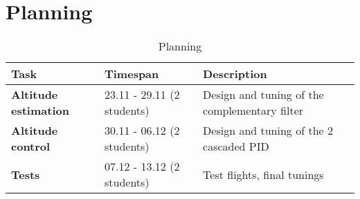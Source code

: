 \documentclass{repMobRob}
\begin{document}
\section{Planning}
\begin{table}[H]
	\centering
	\caption{Planning}
	\label{tab:planning}
	\begin{tabular}{l|l|l}
        \hline
        \textbf{Task} & Timespan & Description \\
        \hline
		\textbf{Altitude estimation} & 23.11 - 29.11 (2 students) & Design and tuning of the complementary filter \\
		\textbf{Altitude control}    & 30.11 - 06.12 (2 students) & Design and tuning of the 2 cascaded PID       \\
		\textbf{Tests}               & 07.12 - 13.12 (2 students) & Test flights, final tunings                   \\
        \hline
	\end{tabular}
\end{table}
\end{document}
